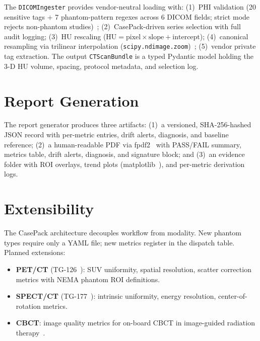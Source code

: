 \documentclass[11pt]{article}
\begin{document}
The \texttt{DICOMIngester} provides vendor-neutral loading with:
(1)~PHI validation (20 sensitive tags $+$ 7 phantom-pattern regexes
across 6 DICOM fields; strict mode rejects non-phantom
studies)~\cite{pydicom};
(2)~CasePack-driven series selection with full audit logging;
(3)~HU rescaling ($\text{HU} = \text{pixel} \times \text{slope} +
\text{intercept}$);
(4)~canonical resampling via trilinear interpolation
(\texttt{scipy.ndimage.zoom})~\cite{scipy};
(5)~vendor private tag extraction.
The output \texttt{CTScanBundle} is a typed Pydantic model holding
the 3-D HU volume, spacing, protocol metadata, and selection log.


\section{Report Generation}
\label{sec:reports}

The report generator produces three artifacts:
(1)~a versioned, SHA-256-hashed JSON record with per-metric
entries, drift alerts, diagnosis, and baseline reference;
(2)~a human-readable PDF via fpdf2~\cite{fpdf2} with PASS/FAIL
summary, metrics table, drift alerts, diagnosis, and signature
block; and
(3)~an evidence folder with ROI overlays, trend plots
(matplotlib~\cite{matplotlib}), and per-metric derivation logs.


\section{Extensibility}
\label{sec:extensibility}

The CasePack architecture decouples workflow from modality.
New phantom types require only a YAML file; new metrics register in
the dispatch table.
Planned extensions:

\begin{itemize}
  \item \textbf{PET/CT} (TG-126~\cite{aapm_tg126}): SUV uniformity,
    spatial resolution, scatter correction metrics with NEMA phantom
    ROI definitions.
  \item \textbf{SPECT/CT} (TG-177~\cite{aapm_tg177}): intrinsic
    uniformity, energy resolution, center-of-rotation metrics.
  \item \textbf{CBCT}: image quality metrics for on-board CBCT in
    image-guided radiation therapy~\cite{bissonnette2008cbct}.
\end{itemize}
\end{document}
